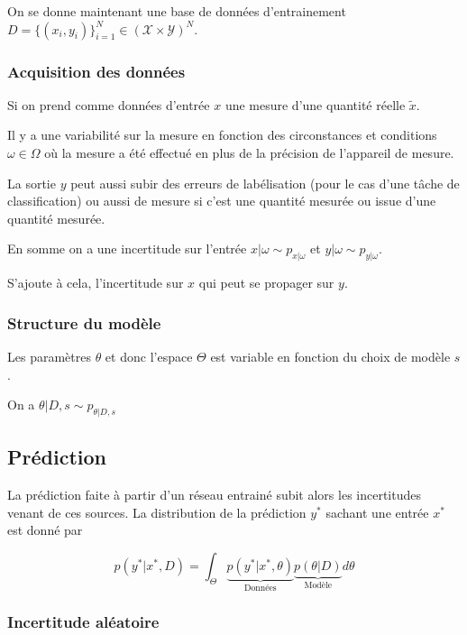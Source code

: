 \documentclass[french,12pt]{article}
\let\oldsubsection\subsection%
\renewcommand{\subsection}{%
  \renewcommand{\theequation}{\thesubsection.\arabic{equation}}%
  \oldsubsection}%
\begin{document}
On se donne maintenant une base de données d'entrainement
$D = \{ (x_i, y_i)\}_{i = 1}^N \in (\mathcal{X} \times \mathcal{Y})^N$.

\subsubsection{Acquisition des données}

Si on prend comme données d'entrée $x$ une mesure d'une quantité réelle $\tilde{x}$.

Il y a une variabilité sur la mesure en fonction des circonstances
et conditions $\omega \in \Omega$ où la mesure a été effectué en
plus de la précision de l'appareil de mesure.

La sortie $y$ peut aussi subir des erreurs de labélisation
(pour le cas d'une tâche de classification) ou aussi de mesure si c'est
une quantité mesurée ou issue d'une quantité mesurée.

En somme on a une incertitude sur l'entrée $x | \omega \sim p_{x | \omega}$
et $y | \omega \sim p_{y | \omega}$.

S'ajoute à cela, l'incertitude sur $x$ qui peut se propager sur $y$.

\subsubsection{Structure du modèle}

Les paramètres $\theta$ et donc l'espace $\Theta$ est variable en fonction du choix de modèle $s$.

On a $\theta | D,s \sim p_{\theta | D, s}$

\subsection{Prédiction}

La prédiction faite à partir d'un réseau entrainé subit alors les incertitudes venant
de ces sources. La distribution de la prédiction $y^*$ sachant une entrée $x^*$ est donné par

\begin{equation}
    p(y^* | x^*, D) = \int_{\Theta} \underbrace{p(y^* | x^*, \theta)}_{\text{Données}} \underbrace{p(\theta  | D)}_{\text{Modèle}} d \theta 
\end{equation}

\subsubsection{Incertitude aléatoire}
\end{document}
